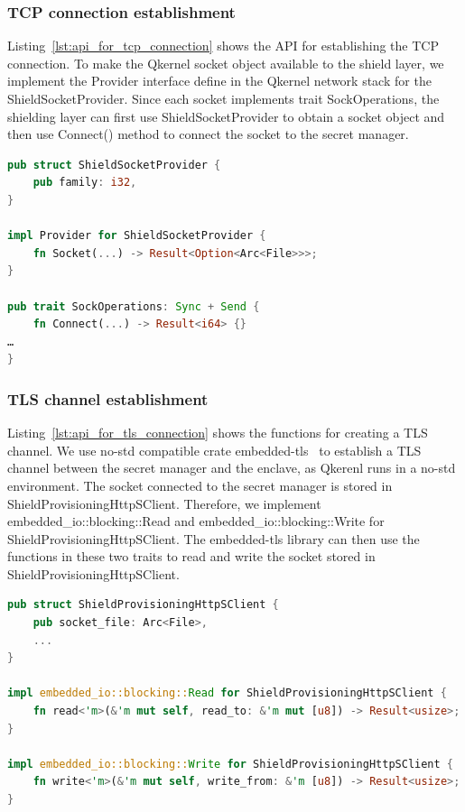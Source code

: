 \subsubsection{TCP connection establishment}

Listing~\ref{lst:api_for_tcp_connection} shows the API for establishing the TCP connection. To make the Qkernel socket object available to the shield layer, we implement the Provider interface define in the Qkernel network stack for the ShieldSocketProvider. Since each socket implements trait SockOperations, the shielding layer can 
first use ShieldSocketProvider to obtain a socket object and then use Connect() method to connect the socket to the secret manager.

\begin{lstlisting}[language=rust, caption= API for establishing the TCP connection, label={lst:api_for_tcp_connection}]
pub struct ShieldSocketProvider {
    pub family: i32,
}

impl Provider for ShieldSocketProvider {
    fn Socket(...) -> Result<Option<Arc<File>>>;
}

pub trait SockOperations: Sync + Send {
    fn Connect(...) -> Result<i64> {}
…
}    
\end{lstlisting}

\subsubsection{TLS channel establishment}
Listing~\ref{lst:api_for_tls_connection} shows the functions for creating a TLS channel. We use no-std compatible crate embedded-tls~\cite*{embede_tls}  to establish a TLS channel between the secret manager and the enclave, as Qkerenl runs in a no-std environment. The socket connected to the secret manager is stored in 
ShieldProvisioningHttpSClient. Therefore, we implement embedded\_io::blocking::Read and embedded\_io::blocking::Write for ShieldProvisioningHttpSClient. The embedded-tls library can then use the functions in these two traits to read and write 
the socket stored in ShieldProvisioningHttpSClient.

\begin{lstlisting}[language=rust, caption= API for establishing the TLS channel, label={lst:api_for_tls_connection}]
pub struct ShieldProvisioningHttpSClient {
    pub socket_file: Arc<File>,
    ...
}

impl embedded_io::blocking::Read for ShieldProvisioningHttpSClient {
    fn read<'m>(&'m mut self, read_to: &'m mut [u8]) -> Result<usize>;
}

impl embedded_io::blocking::Write for ShieldProvisioningHttpSClient {
    fn write<'m>(&'m mut self, write_from: &'m [u8]) -> Result<usize>;
}
\end{lstlisting}

